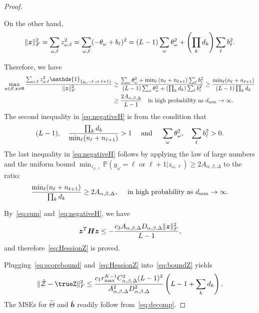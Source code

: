 \documentclass{article}
\theoremstyle{plain}
\theoremstyle{definition}
\begin{document}
\begin{proof}
\begin{enumerate}
On the other hand,
\[
\lVert\bm{z}\rVert_F^2=\sum_{\omega,\ell}z^2_{\omega,\ell}=\sum_{\omega,\ell}(-\theta_\omega+b_\ell)^2=(L-1)\sum_{\omega}\theta^2_\omega+\left(\prod_k d_k\right)\sum_\ell b^2_\ell.
\]

Therefore, we have
\begin{align}\label{eq:negativeH}
\max_{\mz\in\tS,\mz\neq \mathbf{0}}{\sum_{\omega,\ell} z^2_{\omega,\ell}\mathds{1}_{\{y_\omega=\ell \text{ or }\ell+1\}} \over \FnormSize{}{\mz}^2}&\geq {\sum_{\omega}\theta^2_\omega+\min_\ell\left(n_{\ell}+n_{\ell+1}\right)\sum_{\ell}b_\ell^2\over(L-1)\sum_{\omega}\theta^2_\omega+\left(\prod_k d_k\right)\sum_\ell b^2_\ell}
\geq{\min_{\ell}(n_\ell+n_{\ell+1})\over (L-1)\prod_k d_k}\notag\\&\geq {2A_{\alpha,\beta,\Delta}\over L-1}\quad \text{in high probability as $d_{\min}\to \infty$}. 
\end{align}
The second inequality in \eqref{eq:negativeH} is from the condition that \[(L-1),\quad{\prod_k d_k\over \min_\ell(n_\ell+n_{\ell+1})}>1\quad\text{ and } \quad \sum_{\omega}\theta_\omega^2,\quad\sum_\ell b_\ell^2 >0.\]
The last inequality in \eqref{eq:negativeH} follows by applying the law of large numbers and the uniform bound $\min_{z_{\omega,\ell}}\mathbb{P}(y_{\omega}=\ell \text{ or }\ell+1|z_{\omega,\ell})\geq 2A_{\alpha,\beta,\Delta}$ to the ratio:
\[
{\min_{\ell}(n_\ell+n_{\ell+1})\over \prod_k d_k}\geq 2A_{\alpha,\beta,\Delta}, \quad \text{ in high probability as $d_{\min}\to \infty$}.
\] 




By~\eqref{eq:sum} and~\eqref{eq:negativeH}, we have
\begin{equation}\label{eq:boundH}
\bm{z}^T\bm{H}\bm{z} \leq-{c_3A_{\alpha,\beta,\Delta}D_{\alpha,\beta,\Delta}\lVert\bm{z}\rVert_F^2\over L-1},
\end{equation}
and therefore~\eqref{eq:HessionZ} is proved.
\end{enumerate}

 Plugging~\eqref{eq:scorebound} and~\eqref{eq:HessionZ} into~\eqref{eq:boundZ} yields
\[
\FnormSize{}{\hat \tZ-\trueZ}^2 \leq {c_1r^{K-1}_{\max}C^2_{\alpha,\beta,\Delta}(L-1)^2\over A^2_{\alpha,\beta,\Delta}D^2_{\alpha,\beta,\Delta}}\left(L-1+\sum_k d_k\right).
\]
The MSEs for $\hat \Theta$ and $\hat {\bm{b}}$ readily follow from~\eqref{eq:decomp}. 

 
\end{proof}
\end{document}
